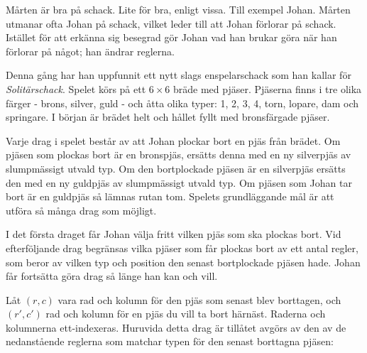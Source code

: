 Mårten är bra på schack. Lite för bra, enligt vissa. Till exempel Johan. Mårten utmanar ofta Johan på schack,
vilket leder till att Johan förlorar på schack. Istället för att erkänna sig besegrad gör Johan vad han
brukar göra när han förlorar på något; han ändrar reglerna.

Denna gång har han uppfunnit ett nytt slags enspelarschack som han kallar för \emph{Solitärschack}. Spelet
körs på ett $6 \times 6$ bräde med pjäser. Pjäserna finns i tre olika färger - brons, silver, guld - och
åtta olika typer: 1, 2, 3, 4, torn, lopare, dam och springare. I början är brädet helt och hållet fyllt med bronsfärgade pjäser.

Varje drag i spelet består av att Johan plockar bort en pjäs från brädet. Om pjäsen som plockas bort är en bronspjäs,
ersätts denna med en ny silverpjäs av slumpmässigt utvald typ. Om den bortplockade pjäsen är en silverpjäs ersätts den
med en ny guldpjäs av slumpmässigt utvald typ. Om pjäsen som Johan tar bort är en guldpjäs så lämnas rutan tom.
Spelets grundläggande mål är att utföra så många drag som möjligt.

I det första draget får Johan välja fritt vilken pjäs som ska plockas bort. Vid efterföljande drag begränsas vilka pjäser
som får plockas bort av ett antal regler, som beror av vilken typ och position den senast bortplockade pjäsen hade. Johan
får fortsätta göra drag så länge han kan och vill.

Låt $(r, c)$ vara rad och kolumn för den pjäs som senast blev borttagen, och $(r', c')$ rad och kolumn för en
pjäs du vill ta bort härnäst. Raderna och kolumnerna ett-indexeras. Huruvida detta drag är tillåtet avgörs av
den av de nedanstående reglerna som matchar typen för den senast borttagna pjäsen:


